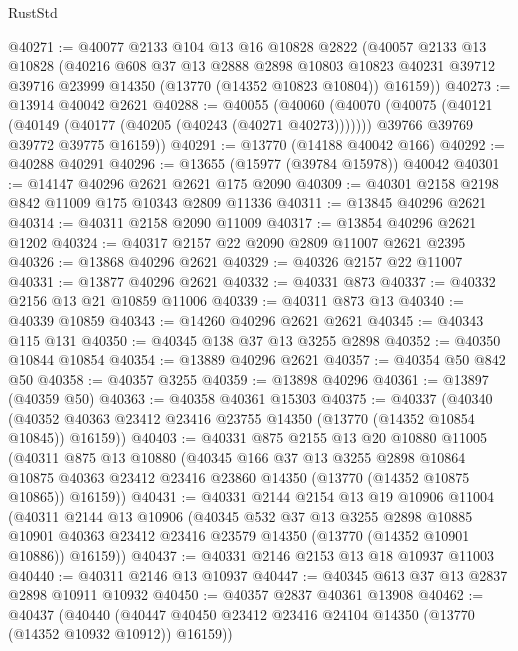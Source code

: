 \begin{lexlean}{RustStd}
\begin{coremodule}
@40271 := @40077
    @2133
    @104
    @13
    @16
    @10828
    @2822
    (@40057
      @2133
      @13
      @10828
      (@40216
        @608
        @37
        @13
        @2888
        @2898
        @10803
        @10823
        @40231
        @39712
        @39716
        @23999
        @14350
        (@13770 (@14352 @10823 @10804))
        @16159))
@40273 := @13914 @40042 @2621
@40288 := @40055
    (@40060
      (@40070
        (@40075 (@40121 (@40149 (@40177 (@40205 (@40243 (@40271 @40273)))))))
        @39766
        @39769
        @39772
        @39775
        @16159))
@40291 := @13770 (@14188 @40042 @166)
@40292 := @40288 @40291
@40296 := @13655 (@15977 (@39784 @15978)) @40042
@40301 := @14147 @40296 @2621 @2621 @175 @2090
@40309 := @40301 @2158 @2198 @842 @11009 @175 @10343 @2809 @11336
@40311 := @13845 @40296 @2621
@40314 := @40311 @2158 @2090 @11009
@40317 := @13854 @40296 @2621 @1202
@40324 := @40317 @2157 @22 @2090 @2809 @11007 @2621 @2395
@40326 := @13868 @40296 @2621
@40329 := @40326 @2157 @22 @11007
@40331 := @13877 @40296 @2621
@40332 := @40331 @873
@40337 := @40332 @2156 @13 @21 @10859 @11006
@40339 := @40311 @873 @13
@40340 := @40339 @10859
@40343 := @14260 @40296 @2621 @2621
@40345 := @40343 @115 @131
@40350 := @40345 @138 @37 @13 @3255 @2898
@40352 := @40350 @10844 @10854
@40354 := @13889 @40296 @2621
@40357 := @40354 @50 @842 @50
@40358 := @40357 @3255
@40359 := @13898 @40296
@40361 := @13897 (@40359 @50)
@40363 := @40358 @40361 @15303
@40375 := @40337
    (@40340 (@40352 @40363 @23412 @23416 @23755 @14350 (@13770 (@14352 @10854 @10845)) @16159))
@40403 := @40331
    @875
    @2155
    @13
    @20
    @10880
    @11005
    (@40311
      @875
      @13
      @10880
      (@40345
        @166
        @37
        @13
        @3255
        @2898
        @10864
        @10875
        @40363
        @23412
        @23416
        @23860
        @14350
        (@13770 (@14352 @10875 @10865))
        @16159))
@40431 := @40331
    @2144
    @2154
    @13
    @19
    @10906
    @11004
    (@40311
      @2144
      @13
      @10906
      (@40345
        @532
        @37
        @13
        @3255
        @2898
        @10885
        @10901
        @40363
        @23412
        @23416
        @23579
        @14350
        (@13770 (@14352 @10901 @10886))
        @16159))
@40437 := @40331 @2146 @2153 @13 @18 @10937 @11003
@40440 := @40311 @2146 @13 @10937
@40447 := @40345 @613 @37 @13 @2837 @2898 @10911 @10932
@40450 := @40357 @2837 @40361 @13908
@40462 := @40437
    (@40440 (@40447 @40450 @23412 @23416 @24104 @14350 (@13770 (@14352 @10932 @10912)) @16159))

\end{coremodule}
\end{lexlean}
